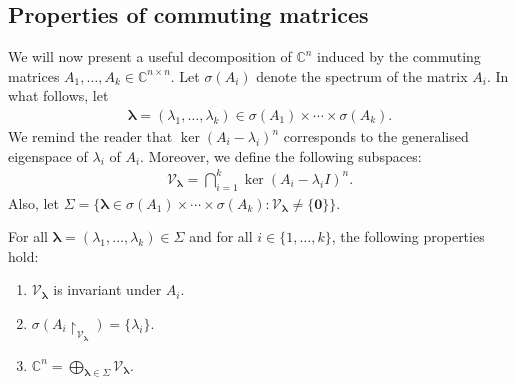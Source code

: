 \subsection{Properties of commuting matrices}

We will now present a useful decomposition of $\mathbb{C}^{n}$ induced by the commuting matrices $A_{1}, \ldots, A_{k} \in \mathbb{C}^{n \times n}$. Let $\sigma(A_{i})$ denote the spectrum of the matrix $A_{i}$. In what follows, let
\begin{align*}
\boldsymbol{\lambda} = (\lambda_{1}, \ldots, \lambda_{k}) \in \sigma(A_{1}) \times \cdots \times \sigma(A_{k}) .
\end{align*}
We remind the reader that $\ker(A_{i} - \lambda_{i})^{n}$ corresponds to the generalised eigenspace of $\lambda_{i}$ of $A_{i}$. Moreover, we define the following subspaces:
\begin{align*}
\mathcal{V}_{\boldsymbol{\lambda}} = \bigcap \limits_{i=1}^{k} \ker(A_{i} - \lambda_{i} I)^{n}.
\end{align*}
Also, let $\Sigma = \lbrace \boldsymbol{\lambda} \in \sigma(A_{1}) \times \cdots \times \sigma(A_{k}) : \mathcal{V}_{\boldsymbol{\lambda}} \neq \lbrace \boldsymbol{0} \rbrace \rbrace$.

\begin{theorem}
\label{subspace_decomposition}
For all $\boldsymbol{\lambda} = (\lambda_{1}, \ldots, \lambda_{k}) \in \Sigma$ and for all $i \in \lbrace 1, \ldots, k \rbrace$, the following properties hold:

\begin{enumerate}

\item $\mathcal{V}_{\boldsymbol{\lambda}}$ is invariant under $A_{i}$.

\item $\sigma(A_{i} \restriction_{\mathcal{V}_{\boldsymbol{\lambda}}}) = \lbrace \lambda_{i} \rbrace$.

\item $\mathbb{C}^{n} = \bigoplus \limits_{\boldsymbol{\lambda} \in \Sigma} \mathcal{V}_{\boldsymbol{\lambda}} .$

\end{enumerate}
\end{theorem}

